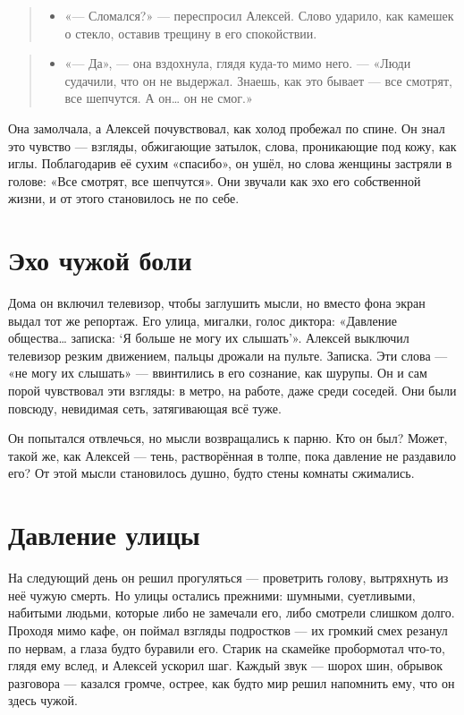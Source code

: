 \documentclass[12pt,a4paper]{book}
\newenvironment{dialogue}{\begin{quote}\itshape\begin{itemize}\item[]}{\end{itemize}\end{quote}}
\begin{document}
\begin{dialogue}
«— Сломался?» — переспросил Алексей. Слово ударило, как камешек о стекло, оставив трещину в его спокойствии.
\end{dialogue}

\begin{dialogue}
«— Да», — она вздохнула, глядя куда-то мимо него. — «Люди судачили, что он не выдержал. Знаешь, как это бывает — все смотрят, все шепчутся. А он… он не смог.»
\end{dialogue}

Она замолчала, а Алексей почувствовал, как холод пробежал по спине. Он знал это чувство — взгляды, обжигающие затылок, слова, проникающие под кожу, как иглы. Поблагодарив её сухим «спасибо», он ушёл, но слова женщины застряли в голове: «Все смотрят, все шепчутся». Они звучали как эхо его собственной жизни, и от этого становилось не по себе.

\section{Эхо чужой боли}

Дома он включил телевизор, чтобы заглушить мысли, но вместо фона экран выдал тот же репортаж. Его улица, мигалки, голос диктора: «Давление общества… записка: ‘Я больше не могу их слышать’». Алексей выключил телевизор резким движением, пальцы дрожали на пульте. Записка. Эти слова — «не могу их слышать» — ввинтились в его сознание, как шурупы. Он и сам порой чувствовал эти взгляды: в метро, на работе, даже среди соседей. Они были повсюду, невидимая сеть, затягивающая всё туже.

Он попытался отвлечься, но мысли возвращались к парню. Кто он был? Может, такой же, как Алексей — тень, растворённая в толпе, пока давление не раздавило его? От этой мысли становилось душно, будто стены комнаты сжимались.

\section{Давление улицы}

На следующий день он решил прогуляться — проветрить голову, вытряхнуть из неё чужую смерть. Но улицы остались прежними: шумными, суетливыми, набитыми людьми, которые либо не замечали его, либо смотрели слишком долго. Проходя мимо кафе, он поймал взгляды подростков — их громкий смех резанул по нервам, а глаза будто буравили его. Старик на скамейке пробормотал что-то, глядя ему вслед, и Алексей ускорил шаг. Каждый звук — шорох шин, обрывок разговора — казался громче, острее, как будто мир решил напомнить ему, что он здесь чужой.
\end{document}
